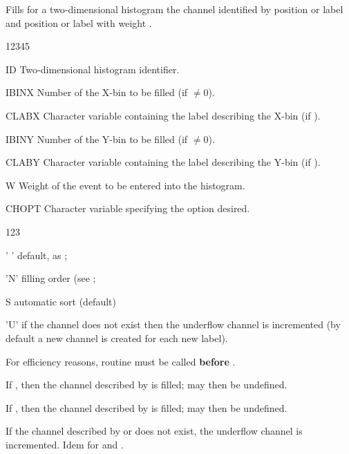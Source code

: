 
\Action Fills for a two-dimensional histogram the channel identified
by position  or label  and
position  or label  with weight .

\begin{DLtt}{12345}
\item[ID]     Two-dimensional histogram identifier.
\item[IBINX]  Number of the X-bin to be filled (if $\ne0$).
\item[CLABX]  Character variable containing the label 
              describing the X-bin (if ).
\item[IBINY]  Number of the Y-bin to be filled (if $\ne0$).
\item[CLABY]  Character variable containing the label 
              describing the Y-bin (if ).
\item[W]      Weight of the event to be entered into the histogram.
\item[CHOPT]  Character variable specifying the option desired.
              \begin{DLtt}{123}
                \item[' '] default, as ;
                \item['N'] filling order (see ;
                \item[S]   automatic sort (default)
                \item['U'] if the channel does not exist 
                           then the underflow channel is incremented
                           (by default a new channel is created for each new label).
                \end{DLtt}
\end{DLtt}

\newpage%

\Remarks
\begin{UL}
\item For efficiency reasons, routine  must be called  
      {\bf before} .
\item If , then the channel described by 
      is filled;  may then be undefined.  
\item If , then the channel described by 
      is filled;  may then be undefined.  
\item If the channel described by  or  does not exist,
      the underflow channel is incremented. Idem for  and .
\end{UL} 

